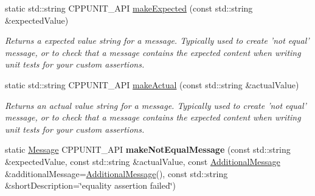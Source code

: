 \begin{DoxyCompactItemize}
static std\+::string C\+P\+P\+U\+N\+I\+T\+\_\+\+A\+P\+I \hyperlink{struct_asserter_a4814efd8fb14afd1b4115f9eed3f1d29}{make\+Expected} (const std\+::string \&expected\+Value)
\begin{DoxyCompactList}\small\item\em Returns a expected value string for a message. Typically used to create 'not equal' message, or to check that a message contains the expected content when writing unit tests for your custom assertions. \end{DoxyCompactList}\item 
static std\+::string C\+P\+P\+U\+N\+I\+T\+\_\+\+A\+P\+I \hyperlink{struct_asserter_acbaa32d719df8ba018024f89e1270125}{make\+Actual} (const std\+::string \&actual\+Value)
\begin{DoxyCompactList}\small\item\em Returns an actual value string for a message. Typically used to create 'not equal' message, or to check that a message contains the expected content when writing unit tests for your custom assertions. \end{DoxyCompactList}\item 
\hypertarget{struct_asserter_af2f68a76db704d1df2287255bc45c8ca}{static \hyperlink{class_message}{Message} C\+P\+P\+U\+N\+I\+T\+\_\+\+A\+P\+I {\bfseries make\+Not\+Equal\+Message} (const std\+::string \&expected\+Value, const std\+::string \&actual\+Value, const \hyperlink{class_additional_message}{Additional\+Message} \&additional\+Message=\hyperlink{class_additional_message}{Additional\+Message}(), const std\+::string \&short\+Description=\char`\"{}equality assertion failed\char`\"{})}\label{struct_asserter_af2f68a76db704d1df2287255bc45c8ca}


\end{DoxyCompactItemize}
